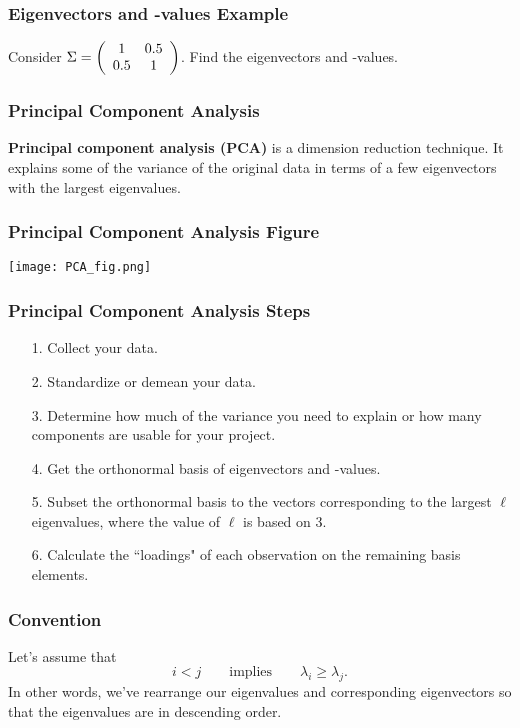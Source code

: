 \documentclass{beamer}
\begin{document}
\begin{frame}[t]
\frametitle{Eigenvectors and -values Example}
\begin{Example}
Consider $\Sigma = \left(\begin{array}{c c} 1	&	0.5\\ 0.5 & 1\end{array}\right)$. Find the eigenvectors and -values.
\end{Example}

\end{frame}

\begin{frame}
\frametitle{Principal Component Analysis}
{\bf Principal component analysis (PCA)} is a dimension reduction technique. It explains some of the variance of the original data in terms of a few eigenvectors with the largest eigenvalues. 

\end{frame}

\begin{frame}
\frametitle{Principal Component Analysis Figure}

\begin{center}
\texttt{[image: PCA\_fig.png]}
\end{center}
\end{frame}

\begin{frame}
\frametitle{Principal Component Analysis Steps}

\begin{enumerate}
\item[1.] Collect your data.
\item[2.] Standardize or demean your data.
\item[3.] Determine how much of the variance you need to explain or how many components are usable for your project.
\item[4.] Get the orthonormal basis of eigenvectors and -values.
\item[5.] Subset the orthonormal basis to the vectors corresponding to the largest $\ell$ eigenvalues, where the value of $\ell$ is based on 3.
\item[6.] Calculate the ``loadings" of each observation on the remaining basis elements.
\end{enumerate}
\end{frame}

\begin{frame}
\frametitle{Convention}
Let's assume that 
$$
i < j\qquad\text{implies}\qquad \lambda_i \geq \lambda_j.
$$ 
In other words, we've rearrange our eigenvalues and corresponding eigenvectors so that the eigenvalues are in descending order.
\end{frame}
\end{document}
